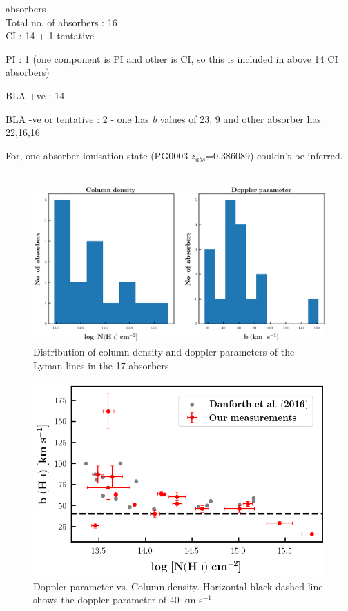 \documentclass[12pt,draft]{report}
\newcommand\ion[2]{\text{#1\,\textsc{\lowercase{#2}}}}
\begin{document}
\ion{O}{vi} absorbers \\ 

Total no. of absorbers : 16 \\

CI : 14 + 1 tentative 

PI : 1 (one component is PI and other is CI, so this is included in above 14 CI absorbers)

BLA +ve : 14 

BLA -ve or tentative : 2 - one has \emph{b} values of 23, 9 and other absorber has 22,16,16 

For, one absorber ionisation state (PG0003 $z_{abs}$=0.386089) couldn't be inferred. \\\\

\newpage

\begin{figure}[!t]
\centering
\includegraphics[width=0.8\linewidth]{Distribution_NH_b.png}
\caption{Distribution of column density and doppler parameters of the Lyman lines in the 17 absorbers}
\end{figure}

\begin{figure}[!b]
\centering
\includegraphics[width=0.8\linewidth]{Result_plots/NHi_vs_bHi_danforth.png}
\caption{ Doppler parameter vs. Column density. Horizontal black dashed line shows the doppler parameter of 40 km s$^{-1}$}
\end{figure}
\end{document}
